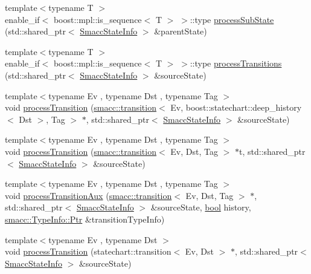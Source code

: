 \begin{DoxyCompactItemize}
\item 
{\footnotesize template$<$typename T $>$ }\\enable\+\_\+if$<$ boost\+::mpl\+::is\+\_\+sequence$<$ T $>$ $>$\+::type \hyperlink{namespacesmacc_ad37426186f133b3653e9adae5b313699}{process\+Sub\+State} (std\+::shared\+\_\+ptr$<$ \hyperlink{classsmacc_1_1SmaccStateInfo}{Smacc\+State\+Info} $>$ \&parent\+State)
\item 
{\footnotesize template$<$typename T $>$ }\\enable\+\_\+if$<$ boost\+::mpl\+::is\+\_\+sequence$<$ T $>$ $>$\+::type \hyperlink{namespacesmacc_aa41f91df712a86c870af2816553f478e}{process\+Transitions} (std\+::shared\+\_\+ptr$<$ \hyperlink{classsmacc_1_1SmaccStateInfo}{Smacc\+State\+Info} $>$ \&source\+State)
\item 
{\footnotesize template$<$typename Ev , typename Dst , typename Tag $>$ }\\void \hyperlink{namespacesmacc_ad68e98e3ceef730b5724cf0b59b0d6fd}{process\+Transition} (\hyperlink{classsmacc_1_1transition}{smacc\+::transition}$<$ Ev, boost\+::statechart\+::deep\+\_\+history$<$ Dst $>$, Tag $>$ $\ast$, std\+::shared\+\_\+ptr$<$ \hyperlink{classsmacc_1_1SmaccStateInfo}{Smacc\+State\+Info} $>$ \&source\+State)
\item 
{\footnotesize template$<$typename Ev , typename Dst , typename Tag $>$ }\\void \hyperlink{namespacesmacc_aac7476bd76db0cc08bba3231d8a5e7fe}{process\+Transition} (\hyperlink{classsmacc_1_1transition}{smacc\+::transition}$<$ Ev, Dst, Tag $>$ $\ast$t, std\+::shared\+\_\+ptr$<$ \hyperlink{classsmacc_1_1SmaccStateInfo}{Smacc\+State\+Info} $>$ \&source\+State)
\item 
{\footnotesize template$<$typename Ev , typename Dst , typename Tag $>$ }\\void \hyperlink{namespacesmacc_aeb513df154ddf19911dacd40d463015a}{process\+Transition\+Aux} (\hyperlink{classsmacc_1_1transition}{smacc\+::transition}$<$ Ev, Dst, Tag $>$ $\ast$, std\+::shared\+\_\+ptr$<$ \hyperlink{classsmacc_1_1SmaccStateInfo}{Smacc\+State\+Info} $>$ \&source\+State, \hyperlink{classbool}{bool} history, \hyperlink{classsmacc_1_1TypeInfo_aca0cd51c7c9ef85f6c98dc32878af226}{smacc\+::\+Type\+Info\+::\+Ptr} \&transition\+Type\+Info)
\item 
{\footnotesize template$<$typename Ev , typename Dst $>$ }\\void \hyperlink{namespacesmacc_a89246662ad7a95c78e6fa5eedf0c01a5}{process\+Transition} (statechart\+::transition$<$ Ev, Dst $>$ $\ast$, std\+::shared\+\_\+ptr$<$ \hyperlink{classsmacc_1_1SmaccStateInfo}{Smacc\+State\+Info} $>$ \&source\+State)

\end{DoxyCompactItemize}
